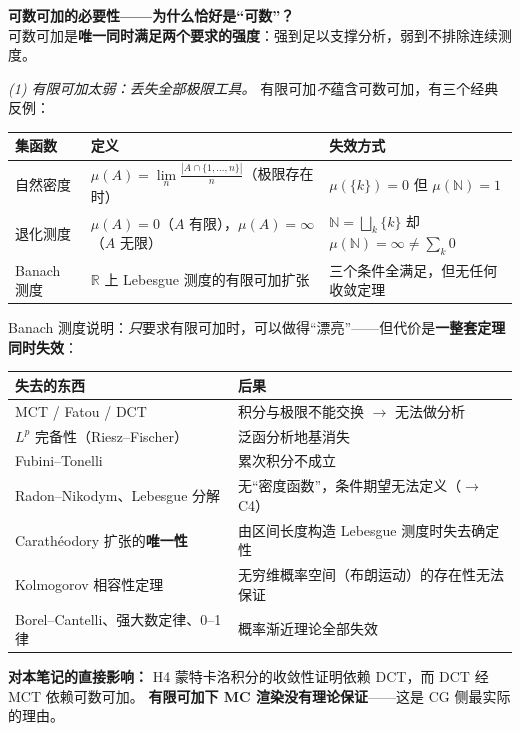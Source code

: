 \textbf{可数可加的必要性——为什么恰好是“可数”？}\\
可数可加是\textbf{唯一同时满足两个要求的强度}：强到足以支撑分析，弱到不排除连续测度。

\textit{(1) 有限可加太弱：丢失全部极限工具。} 有限可加\emph{不}蕴含可数可加，有三个经典反例：

\begin{center}
\begin{tabular}{p{2.8cm}p{5.6cm}p{4.4cm}}
\toprule
\textbf{集函数} & \textbf{定义} & \textbf{失效方式} \\
\midrule
自然密度 & $\mu(A)=\lim\limits_{n}\frac{|A\cap\{1,\dots,n\}|}{n}$（极限存在时） &
$\mu(\{k\})=0$ 但 $\mu(\mathbb{N})=1$ \\
\addlinespace
退化测度 & $\mu(A)=0$（$A$ 有限），$\mu(A)=\infty$（$A$ 无限） &
$\mathbb{N}=\bigsqcup_k\{k\}$ 却 $\mu(\mathbb{N})=\infty \neq \sum_k 0$ \\
\addlinespace
Banach 测度 & $\mathbb{R}$ 上 Lebesgue 测度的有限可加扩张 &
三个条件全满足，但无任何收敛定理 \\
\bottomrule
\end{tabular}
\end{center}

Banach 测度说明：\emph{只}要求有限可加时，可以做得“漂亮”——但代价是\textbf{一整套定理同时失效}：

\begin{center}
\begin{tabular}{p{5.2cm}p{7.8cm}}
\toprule
\textbf{失去的东西} & \textbf{后果} \\
\midrule
MCT / Fatou / DCT & 积分与极限不能交换 $\to$ 无法做分析 \\
$L^p$ 完备性（Riesz--Fischer） & 泛函分析地基消失 \\
Fubini--Tonelli & 累次积分不成立 \\
Radon--Nikodym、Lebesgue 分解 & 无“密度函数”，条件期望无法定义（$\to$ C4） \\
Carathéodory 扩张的\textbf{唯一性} & 由区间长度构造 Lebesgue 测度时失去确定性 \\
Kolmogorov 相容性定理 & 无穷维概率空间（布朗运动）的存在性无法保证 \\
Borel--Cantelli、强大数定律、0--1 律 & 概率渐近理论全部失效 \\
\bottomrule
\end{tabular}
\end{center}

\textbf{对本笔记的直接影响：} H4 蒙特卡洛积分的收敛性证明依赖 DCT，而 DCT 经 MCT 依赖可数可加。
\textbf{有限可加下 MC 渲染没有理论保证}——这是 CG 侧最实际的理由。

